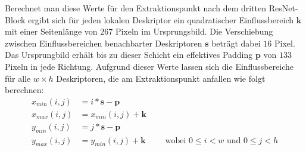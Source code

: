 Berechnet man diese Werte für den Extraktionspunkt nach dem dritten ResNet-Block ergibt sich für jeden lokalen Deskriptor ein quadratischer Einflussbereich $\mathbf{k}$ mit einer Seitenlänge von $267$ Pixeln im Ursprungsbild. Die Verschiebung zwischen Einflussbereichen benachbarter Deskriptoren $\mathbf{s}$ beträgt dabei $16$ Pixel. Das Ursprungbild erhält bis zu dieser Schicht ein effektives Padding $\mathbf{p}$ von $133$ Pixeln in jede Richtung. Aufgrund dieser Werte lassen sich die Einflussbereiche für alle $w \times h$ Deskriptoren, die am Extraktionspunkt anfallen wie folgt berechnen:
\begin{align}
x_{min}(i,j) &= i*\mathbf{s} - \mathbf{p} 
\\
x_{max}(i,j) &= x_{min}(i,j) + \mathbf{k}
\\ 
y_{min}(i,j) &= j*\mathbf{s} - \mathbf{p}
\\ 
y_{max}(i,j) &= y_{min}(i,j) + \mathbf{k} \qquad\text{ wobei } 0\leq i < w \text{ und } 0\leq j < h
\end{align}

